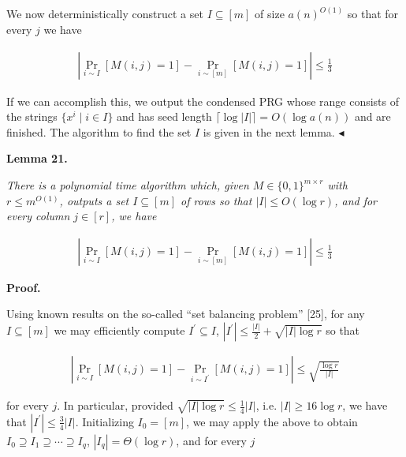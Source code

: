 \documentclass[10pt,a4paper]{article}
\begin{document}
We now deterministically construct a set $I\subseteq[m]$ of size $a(n)^{O(1)}$ so that for every $j$ we have\par


\[\begin{gathered}
|\Pr_{i\sim I}[M(i,j)=1]-\Pr_{i\sim[m]}[M(i,j)=1]|\leq\frac{1}{3}
\end{gathered}\]


If we can accomplish this, we output the condensed PRG whose range consists of the strings $\{x^{i}\mid i\in I\}$ and has seed length $\lceil\log|I|\rceil=O(\log a(n))$ and are finished. The algorithm to find the set $I$ is given in the next lemma.
$\blacktriangleleft$\par





\par\medskip\noindent\textbf{
\textbf{Lemma 21}\textbf{.}
}\par



\emph{There is a polynomial time algorithm which, given $M\in\{0,1\}^{m\times r}$ with $r\leq m^{O(1)}$, outputs a set $I\subseteq[m]$ of rows so that $|I|\leq O(\log r)$, and for every column $j\in[r]$, we have}\par


\[\begin{gathered}
|\Pr_{i\sim I}[M(i,j)=1]-\Pr_{i\sim[m]}[M(i,j)=1]|\leq\frac{1}{3}
\end{gathered}\]







\par\medskip\noindent\textbf{Proof.}\par




Using known results on the so-called “set balancing problem” [25], for any $I\subseteq[m]$ we may efficiently compute $I^{\prime}\subseteq I$, $|I^{\prime}|\leq\frac{|I|}{2}+\sqrt{|I|\log r}$ so that\par


\[\begin{gathered}
|\Pr_{i\sim I}[M(i,j)=1]-\Pr_{i\sim I^{\prime}}[M(i,j)=1]|\leq\sqrt{\frac{\log
r}{|I|}}
\end{gathered}\]


for every $j$. In particular, provided $\sqrt{|I|\log r}\leq\frac{1}{4}|I|$, i.e. $|I|\geq 16\log r$, we have that $|I^{\prime}|\leq\frac{3}{4}|I|$.
Initializing $I_{0}=[m]$, we may apply the above to obtain $I_{0}\supseteq I_{1}\supseteq\cdots\supseteq I_{q}$, $|I_{q}|=\Theta(\log r)$, and for every $j$\par
\end{document}
